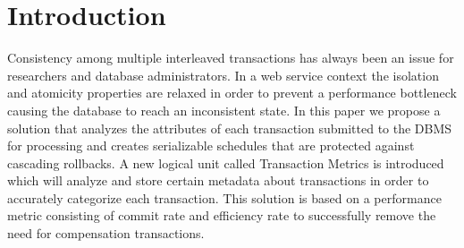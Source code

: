 \documentclass[conference]{IEEEtran}
\begin{document}
%



\section{Introduction}
Consistency among multiple interleaved transactions has always been an issue for researchers and database administrators. In a web service context the isolation and atomicity properties are relaxed in order to prevent a performance bottleneck causing the database to reach an inconsistent state. In this paper we propose a solution that analyzes the attributes of each transaction submitted to the DBMS for processing and creates serializable schedules that are protected against cascading rollbacks. A new logical unit called Transaction Metrics is introduced which will analyze and store certain metadata about transactions in order to accurately categorize each transaction. This solution is based on a performance metric consisting of commit rate and efficiency rate to successfully remove the need for compensation transactions. 
\end{document}
